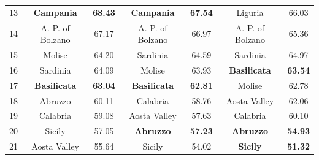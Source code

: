 \begin{table}[h!]
\begin{tabularx}{\textwidth}{c|Cc|Cc|Cc}
13 & \textbf{Campania} & \textbf{68.43} & \textbf{Campania} & \textbf{67.54} & Liguria & 66.03 \\
14 & A. P. of Bolzano & 67.17 & A. P. of Bolzano & 66.97 & A. P. of Bolzano & 65.36 \\
15 & Molise & 64.20 & Sardinia & 64.59 & Sardinia & 64.97 \\
16 & Sardinia & 64.09 & Molise & 63.93 & \textbf{Basilicata} & \textbf{63.54} \\
17 & \textbf{Basilicata} & \textbf{63.04} & \textbf{Basilicata} & \textbf{62.81} & Molise & 62.78 \\
18 & Abruzzo & 60.11 & Calabria & 58.76 & Aosta Valley & 62.06 \\
19 & Calabria & 59.08 & Aosta Valley & 57.63 & Calabria & 60.10 \\
20 & Sicily & 57.05 & \textbf{Abruzzo} & \textbf{57.23} & \textbf{Abruzzo} & \textbf{54.93} \\
21 & Aosta Valley & 55.64 & Sicily & 54.02 & \textbf{Sicily} & \textbf{51.32} \\
\bottomrule
\end{tabularx}
\end{table}

